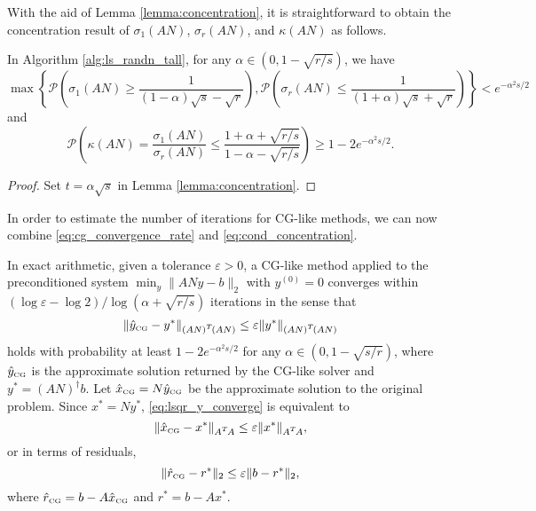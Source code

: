 \documentclass{siamltex}
\newcommand{\CG}{\textrm{\tiny CG}}
\newcommand{\T}{^{\raisebox{0.09em}{\hbox{\tiny $T$}}\hspace{-0.1em}}}
\begin{document}
With the aid of Lemma \ref{lemma:concentration}, it is straightforward to 
obtain the concentration result of $\sigma_1(AN)$, $\sigma_r(AN)$, and 
$\kappa(AN)$ as follows.

\begin{theorem}
  \label{thm:cond_bound}
  In Algorithm \ref{alg:ls_randn_tall}, for any $\alpha \in ( 0, 1 - \sqrt{r/s} )$, we
  have
  \begin{equation}
    \label{eq:sgm_concentration}
    \mbox{$\max \left\{ \mathcal{P} \left(\sigma_1(AN) \geq \frac{1}{ (1-\alpha) \sqrt{s} - \sqrt{r}} \right), \mathcal{P} \left( \sigma_r(AN) \leq \frac{1}{ ( 1 + \alpha ) \sqrt{s} + \sqrt{r}} \right) \right\} < e^{-\alpha^2 s / 2}$}
  \end{equation}
and 
\begin{equation}
    \label{eq:cond_concentration}
    \mathcal{P} \left( \kappa(A N) = \frac{\sigma_1(AN)}{\sigma_r(AN)} \leq \frac{1 + \alpha + \sqrt{r/s}}{1 - \alpha - \sqrt{r/s}} \right) \geq 1 - 2 e^{-\alpha^2 s/2}.
  \end{equation}
\end{theorem}
\begin{proof}
  Set $t = \alpha \sqrt{s}$ in Lemma \ref{lemma:concentration}.
\end{proof}

In order to estimate the number of iterations for CG-like methods, we can now
combine \eqref{eq:cg_convergence_rate} and \eqref{eq:cond_concentration}.

\begin{theorem}
  \label{thm:iter}
  In exact arithmetic, given a tolerance $\varepsilon > 0$, a CG-like method
  applied to the preconditioned system $\min_y \| A N y - b \|_2$ with $y^{(0)}
  = 0$ converges within $(\log \varepsilon - \log 2) / \log ( \alpha +
  \sqrt{r/s} )$ iterations in the sense that
  \begin{equation}
    \label{eq:lsqr_y_converge}
    \|\hat{y}_{\CG} - y^* \|_{(AN)\T(AN)} \leq \varepsilon \| y^* \|_{(AN)\T(AN)}    
  \end{equation}
  holds with probability at least $1 - 2 e^{-\alpha^2 s/2}$ for any $\alpha \in
  ( 0, 1 - \sqrt{s/r} )$, where $\hat{y}_\CG$ is the approximate solution
  returned by the CG-like solver and $y^* = (AN)^\dagger b$. Let $\hat{x}_{\CG}
  = N \hat{y}_{\CG}$ be the approximate solution to the original problem. Since
  $x^* = N y^*$, \eqref{eq:lsqr_y_converge} is equivalent to
  \begin{equation}
    \label{eq:lsqr_x_converge}
    \|\hat{x}_{\CG} - x^* \|_{A\T A} \leq \varepsilon \| x^* \|_{A\T A},
  \end{equation}
  or in terms of residuals,
  \begin{equation}
    \label{eq:lsqr_r_converge}
    \|\hat{r}_{\CG} - r^*\|_2 \leq \varepsilon \| b - r^* \|_2,
  \end{equation}
  where $\hat{r}_{\CG} = b - A \hat{x}_{\CG}$ and $r^* = b - A x^*$.
\end{theorem}
\end{document}
